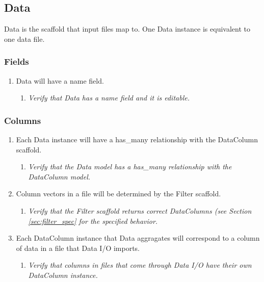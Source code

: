 \subsection{Data}
\label{sec:data_spec}
Data is the scaffold that input files map to. One Data instance is equivalent
to one data file.

\subsubsection{Fields}
	\begin{enumerate}

		\item Data will have a name field. 
		\begin{enumerate}
			\item \textit{ Verify that Data has a name field and it
					is editable. }
		\end{enumerate}
	\end{enumerate}


\subsubsection{Columns}
	\begin{enumerate}

		\item Each Data instance will have a has\_many relationship
			with the DataColumn scaffold.
		\begin{enumerate}
			\item \textit{ Verify that the Data model has a 
					has\_many relationship with the 
					DataColumn model.}
		\end{enumerate}

		\item Column vectors in a file will be determined by the 
			Filter scaffold.
		\begin{enumerate}
			\item \textit{ Verify that the Filter scaffold returns
					correct DataColumns (see Section 
					\ref{sec:filter_spec} for the specified
					behavior. }
		\end{enumerate}



		\item Each DataColumn instance that Data aggragates will 
			correspond to a column of data in a file that 
			Data I/O imports.
		\begin{enumerate}
			\item \textit{ Verify that columns in files that come 
					through Data I/O have their own 
					DataColumn instance. }
		\end{enumerate}
	

	\end{enumerate}
